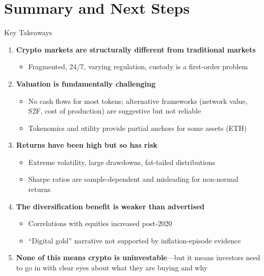 \documentclass[10pt]{beamer}
\begin{document}
\section{Summary and Next Steps}

\begin{frame}{Key Takeaways}
  \begin{enumerate}
    \item \textbf{Crypto markets are structurally different from traditional markets}
    \begin{itemize}
      \item Fragmented, 24/7, varying regulation, custody is a first-order problem
    \end{itemize}
    
    \vspace{0.3em}
    \item \textbf{Valuation is fundamentally challenging}
    \begin{itemize}
      \item No cash flows for most tokens; alternative frameworks (network value, S2F, cost of production) are suggestive but not reliable
      \item Tokenomics and utility provide partial anchors for some assets (ETH)
    \end{itemize}
    
    \vspace{0.3em}
    \item \textbf{Returns have been high but so has risk}
    \begin{itemize}
      \item Extreme volatility, large drawdowns, fat-tailed distributions
      \item Sharpe ratios are sample-dependent and misleading for non-normal returns
    \end{itemize}
    
    \vspace{0.3em}
    \item \textbf{The diversification benefit is weaker than advertised}
    \begin{itemize}
      \item Correlations with equities increased post-2020
      \item ``Digital gold'' narrative not supported by inflation-episode evidence
    \end{itemize}
    
    \vspace{0.3em}
    \item \textbf{None of this means crypto is uninvestable}---but it means investors need to go in with clear eyes about what they are buying and why
  \end{enumerate}
\end{frame}
\end{document}

